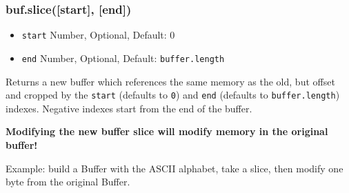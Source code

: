 \begin{Shaded}
\begin{Highlighting}[]
 \NormalTok{);}
 \NormalTok{);}

 \NormalTok{(}   
  \NormalTok{; }
  \NormalTok{; }
\NormalTok{\}}

\NormalTok{, }\NormalTok{, }\NormalTok{);}
\NormalTok{(}\NormalTok{(}\NormalTok{, }\NormalTok{, }\NormalTok{));}

\end{Highlighting}
\end{Shaded}

\subsubsection{buf.slice({[}start{]}, {[}end{]})}

\begin{itemize}
\item
  \texttt{start} Number, Optional, Default: 0
\item
  \texttt{end} Number, Optional, Default: \texttt{buffer.length}
\end{itemize}

Returns a new buffer which references the same memory as the old, but
offset and cropped by the \texttt{start} (defaults to \texttt{0}) and
\texttt{end} (defaults to \texttt{buffer.length}) indexes. Negative
indexes start from the end of the buffer.

\textbf{Modifying the new buffer slice will modify memory in the
original buffer!}

Example: build a Buffer with the ASCII alphabet, take a slice, then
modify one byte from the original Buffer.

